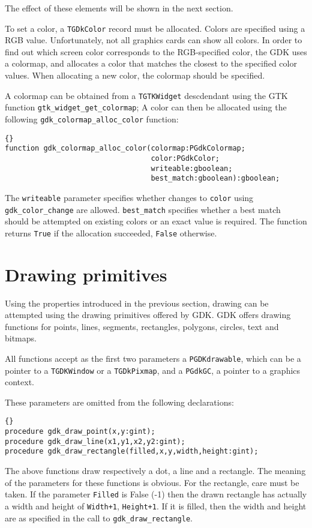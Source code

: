 \documentclass[10pt]{article}
\newcommand{\var}[1]{\texttt{#1}}
\begin{document}
The effect of these elements will be shown in the next section.

To set a color, a \var{TGDkColor} record must be allocated. Colors are
specified using a RGB value. Unfortunately, not all graphics cards can
show all colors. In order to find out which screen color corresponds 
to the RGB-specified color, the GDK uses a colormap, and allocates a
color that matches the closest to the specified color values. 
When allocating a new color, the colormap should be specified.

A colormap can be obtained from a \var{TGTKWidget} descdendant using the GTK function
\var{gtk\_widget\_get\_colormap}; A color can then be allocated
using the following \var{gdk\_colormap\_alloc\_color} function:
\begin{lstlisting}{}
function gdk_colormap_alloc_color(colormap:PGdkColormap; 
                                  color:PGdkColor;
                                  writeable:gboolean; 
                                  best_match:gboolean):gboolean;
\end{lstlisting}{}
The \var{writeable} parameter specifies whether changes to
\var{color} using \var{gdk\_color\_change} are allowed. 
\var{best\_match} specifies whether a best match should be attempted 
on existing colors or an exact value is required.
The function returns \var{True} if the allocation succeeded, 
\var{False} otherwise.

\section{Drawing primitives}
Using the properties introduced in the previous section, drawing can be
attempted using the drawing primitives offered by GDK. GDK offers drawing
functions for points, lines, segments, rectangles, polygons, circles, text
and bitmaps.

All functions accept as the first two parameters a \var{PGDKdrawable}, which
can be a pointer to a \var{TGDKWindow} or a \var{TGDkPixmap}, and a 
\var{PGdkGC}, a pointer to a graphics context. 

These parameters are omitted from the following declarations:
\begin{lstlisting}{}
procedure gdk_draw_point(x,y:gint);
procedure gdk_draw_line(x1,y1,x2,y2:gint);
procedure gdk_draw_rectangle(filled,x,y,width,height:gint);
\end{lstlisting}{}
The above functions draw respectively a dot, a line and a rectangle.
The meaning of the parameters for these functions is obvious.
For the rectangle, care must be taken. If the parameter \var{Filled} is 
False (-1) then the drawn rectangle has actually a width and height of
\var{Width+1}, \var{Height+1}. If it is filled, then the width and 
height are as specified in the call to \var{gdk\_draw\_rectangle}.
\end{document}
